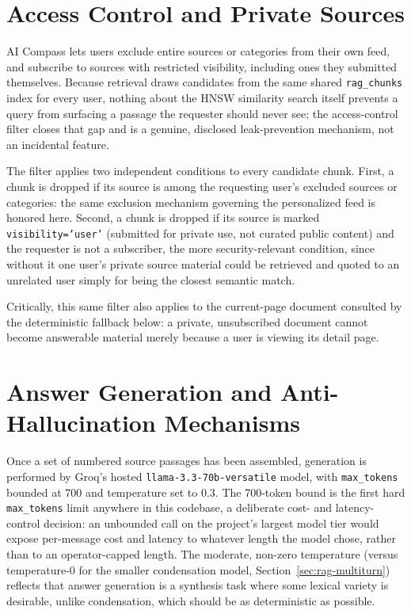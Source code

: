 \section{Access Control and Private Sources}
\label{sec:rag-access-control}

AI Compass lets users exclude entire sources or categories from their own feed, and subscribe to sources with restricted visibility, including ones they submitted themselves. Because retrieval draws candidates from the same shared \texttt{rag\_chunks} index for every user, nothing about the HNSW similarity search itself prevents a query from surfacing a passage the requester should never see; the access-control filter closes that gap and is a genuine, disclosed leak-prevention mechanism, not an incidental feature.

The filter applies two independent conditions to every candidate chunk. First, a chunk is dropped if its source is among the requesting user's excluded sources or categories: the same exclusion mechanism governing the personalized feed is honored here. Second, a chunk is dropped if its source is marked \texttt{visibility='user'} (submitted for private use, not curated public content) and the requester is not a subscriber, the more security-relevant condition, since without it one user's private source material could be retrieved and quoted to an unrelated user simply for being the closest semantic match.

Critically, this same filter also applies to the current-page document consulted by the deterministic fallback below: a private, unsubscribed document cannot become answerable material merely because a user is viewing its detail page.

\section{Answer Generation and Anti-Hallucination Mechanisms}
\label{sec:rag-generation}

Once a set of numbered source passages has been assembled, generation is performed by Groq's hosted \texttt{llama-3.3-70b-versatile} model, with \texttt{max\_tokens} bounded at 700 and temperature set to 0.3. The 700-token bound is the first hard \texttt{max\_tokens} limit anywhere in this codebase, a deliberate cost- and latency-control decision: an unbounded call on the project's largest model tier would expose per-message cost and latency to whatever length the model chose, rather than to an operator-capped length. The moderate, non-zero temperature (versus temperature-0 for the smaller condensation model, Section~\ref{sec:rag-multiturn}) reflects that answer generation is a synthesis task where some lexical variety is desirable, unlike condensation, which should be as deterministic as possible.

